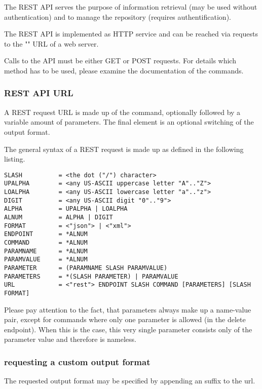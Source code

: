 The REST API serves the purpose of information retrieval (may be used without authentication) and to manage the repository (requires authentification).

The REST API is implemented as HTTP service and can be reached via requests to the "" URL of a web server.

Calls to the API must be either GET or POST requests. For details which method has to be used, please examine the documentation of the commands.

\subsubsection[sec:repository rest api url]{REST API URL}

A REST request URL is made up of the command, optionally followed by a variable amount of parameters. The final element is an optional switching of the output format.

The general syntax of a REST request is made up as defined in the following listing.
\begin{lstlisting}[caption=REST API URL in EBNF]
SLASH          = <the dot ("/") character>
UPALPHA        = <any US-ASCII uppercase letter "A".."Z">
LOALPHA        = <any US-ASCII lowercase letter "a".."z">
DIGIT          = <any US-ASCII digit "0".."9">
ALPHA          = UPALPHA | LOALPHA
ALNUM          = ALPHA | DIGIT
FORMAT         = <"json"> | <"xml">
ENDPOINT       = *ALNUM
COMMAND        = *ALNUM
PARAMNAME      = *ALNUM
PARAMVALUE     = *ALNUM
PARAMETER      = (PARAMNAME SLASH PARAMVALUE)
PARAMETERS     = *(SLASH PARAMETER) | PARAMVALUE
URL            = <"rest"> ENDPOINT SLASH COMMAND [PARAMETERS] [SLASH FORMAT]
\end{lstlisting}

Please pay attention to the fact, that parameters always make up a name-value pair, except for commands where only one parameter is allowed (\ie in the delete endpoint). When this is the case, this very single parameter consists only of the parameter value and therefore is nameless.

\subsubsection[sec:repository rest api output format]{requesting a custom output format}

The requested output format may be specified by appending an suffix to the url.

